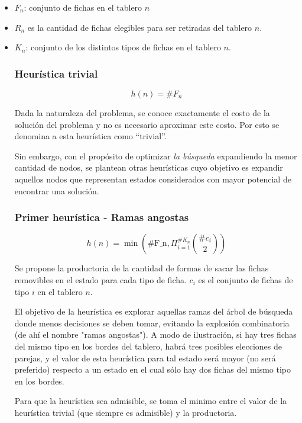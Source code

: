 \documentclass[a4paper,10pt]{article}
\begin{document}
    \begin{itemize}
        \item $F_n$: conjunto de fichas en el tablero $n$
        \item $R_n$ es la cantidad de fichas elegibles para ser retiradas del tablero $n$.
        \item $K_n$: conjunto de los distintos tipos de fichas en el tablero $n$.

    \subsubsection{Heurística trivial}

    \[ h(n) = \# F_n \]

    Dada la naturaleza del problema, se conoce exactamente el costo de la solución del problema y no es necesario aproximar este costo. Por esto se denomina a esta heurística como ``trivial''.

    Sin embargo, con el propósito de optimizar \textit{la búsqueda} expandiendo la menor cantidad de nodos, se plantean otras heurísticas cuyo objetivo es expandir aquellos nodos que representan estados considerados con mayor potencial de encontrar una solución.

    \subsubsection{Primer heurística - Ramas angostas}
        
    \[ h(n) = \min \left (\text{\# F_n}, \Pi_{i=1}^{\# K_n} {\# c_i \choose 2} \right )\]

    Se propone la productoria de la cantidad de formas de sacar las fichas removibles en el estado para cada tipo de ficha. $c_i$ es el conjunto de fichas de tipo $i$ en el tablero $n$.

    El objetivo de la heurística es explorar aquellas ramas del árbol de búsqueda donde menos decisiones se deben tomar, evitando la explosión combinatoria (de ahí el nombre "ramas angostas"). A modo de ilustración, si hay tres fichas del mismo tipo en los bordes del tablero, habrá tres posibles elecciones de parejas, y el valor de esta heurística para tal estado será mayor (no será preferido) respecto a un estado en el cual sólo hay dos fichas del mismo tipo en los bordes.

    Para que la heurística sea admisible, se toma el minimo entre el valor de la heurística trivial (que siempre es admisible) y la productoria.
    

\end{itemize}
\end{document}
